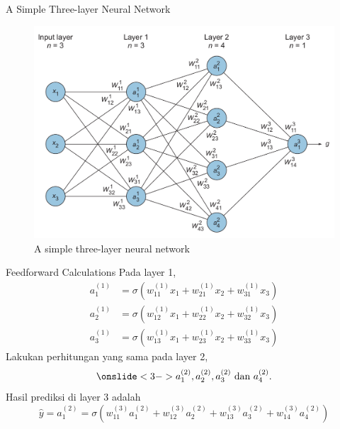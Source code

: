 \documentclass{beamer}
\begin{document}
\begin{frame}{A Simple Three-layer Neural Network}
	\begin{figure}[ht]
		\centering
		\includegraphics[scale=0.25]{images/simple-neural-network}
		\caption{A simple three-layer neural network}
	\end{figure}							
\end{frame}

\begin{frame}{Feedforward Calculations}
	Pada layer 1,
	\begin{align*}
		a_1^{(1)} &= \sigma(w_{11}^{(1)} x_1 + w_{21}^{(1)} x_2 + w_{31}^{(1)} x_3)  \\
		a_2^{(1)} &= \sigma(w_{12}^{(1)} x_1 + w_{22}^{(1)} x_2 + w_{32}^{(1)} x_3)  \\
		a_3^{(1)} &= \sigma(w_{13}^{(1)} x_1 + w_{23}^{(1)} x_2 + w_{33}^{(1)} x_3) 
	\end{align*}
	\onslide<2-> Lakukan perhitungan yang sama pada layer 2,
	\begin{equation*}
		\onslide<3-> a_1^{(2)}, a_2^{(2)}, a_3^{(2)} \text{ dan }a_4^{(2)}.
	\end{equation*}
	Hasil prediksi di layer 3 adalah
	\begin{equation*}
		\hat{y} = a_1^{(2)} = \sigma( w_{11}^{(3)} a_1^{(2)} + w_{12}^{(3)} a_2^{(2)} + w_{13}^{(3)} a_3^{(2)} + w_{14}^{(3)} a_4^{(2)} )
	\end{equation*}
\end{frame}
\end{document}
